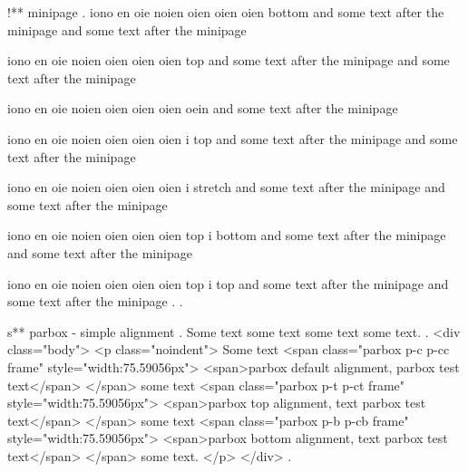 !** minipage
.
iono en oie noien oien oien oien bottom  and some text after the minipage and some text after the minipage

iono en oie noien oien oien oien top  and some text after the minipage and some text after the minipage


iono en oie noien oien oien oien oein  and some text after the minipage

iono en oie noien oien oien oien i top  and some text after the minipage and some text after the minipage

iono en oie noien oien oien oien i stretch  and some text after the minipage and some text after the minipage

iono en oie noien oien oien oien top i bottom  and some text after the minipage and some text after the minipage

iono en oie noien oien oien oien top i top  and some text after the minipage and some text after the minipage
.
.


s** parbox - simple alignment
.
\noindent
Some text
some text
some text
some text.
.
<div class="body">
<p class="noindent">
Some text <span class="parbox p-c p-cc frame" style="width:75.59056px">
<span>parbox default alignment, parbox test text</span>
</span> some text <span class="parbox p-t p-ct frame" style="width:75.59056px">
<span>parbox top alignment, text parbox test text</span>
</span> some text <span class="parbox p-b p-cb frame" style="width:75.59056px">
<span>parbox bottom alignment, text parbox test text</span>
</span> some text.
</p>
</div>
.


